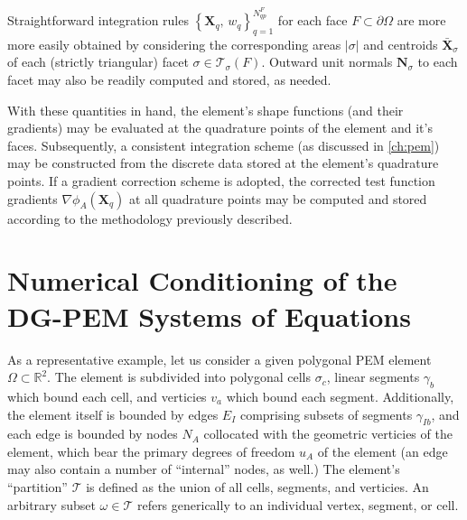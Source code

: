 	Straightforward integration rules $\left\{ \mathbf{X}_q, \, w_q \right\}_{q=1}^{N^F_{qp}}$ for each face $F \subset \partial \Omega$ are more more easily obtained by considering the corresponding areas $|\sigma|$ and centroids $\bar{\mathbf{X}}_\sigma$ of each (strictly triangular) facet $\sigma \in \mathcal{T}_{\sigma} (F)$. Outward unit normals $\mathbf{N}_\sigma$ to each facet may also be readily computed and stored, as needed.

	With these quantities in hand, the element's shape functions (and their gradients) may be evaluated at the quadrature points of the element and it's faces. Subsequently, a consistent integration scheme (as discussed in \ref{ch:pem}) may be constructed from the discrete data stored at the element's quadrature points. If a gradient correction scheme is adopted, the corrected test function gradients $\nabla \phi_A (\mathbf{X}_q)$ at all quadrature points may be computed and stored according to the methodology previously described.

\section{Numerical Conditioning of the \\ DG-PEM Systems of Equations}

As a representative example, let us consider a given polygonal PEM element $\Omega \subset \mathbb{R}^2$. The element is subdivided into polygonal cells $\sigma_c$, linear segments $\gamma_b$ which bound each cell, and verticies $v_a$ which bound each segment. Additionally, the element itself is bounded by edges $E_I$ comprising subsets of segments $\gamma_{Ib}$, and each edge is bounded by nodes $N_A$ collocated with the geometric verticies of the element, which bear the primary degrees of freedom $u_A$ of the element (an edge may also contain a number of ``internal'' nodes, as well.) The element's ``partition'' $\mathcal{T}$ is defined as the union of all cells, segments, and verticies. An arbitrary subset $\omega \in \mathcal{T}$ refers generically to an individual vertex, segment, or cell.

